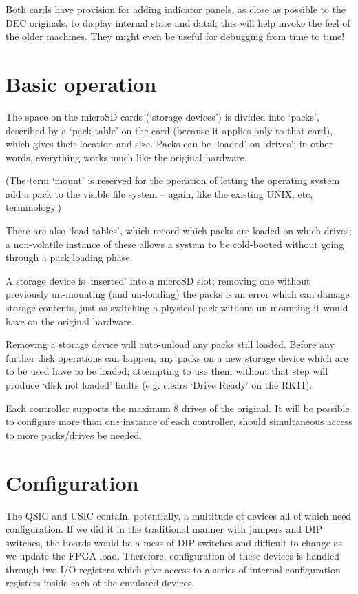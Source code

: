 Both cards have provision for adding indicator panels, as close as possible
to the DEC originals, to display internal state and datal; this will help
invoke the feel of the older machines. They might even be useful for
debugging from time to time!

\section{Basic operation}

The space on the microSD cards (`storage devices') is divided into `packs',
described by a `pack table' on the card (because it applies only to that
card), which gives their location and size. Packs can be `loaded' on
`drives'; in other words, everything works much like the original hardware.

(The term `mount' is reserved for the operation of letting the operating
system add a pack to the visible file system -- again, like the existing UNIX,
etc, terminology.)

There are also `load tables', which record which packs are loaded on which
drives; a non-volatile instance of these allows a system to be cold-booted
without going through a pack loading phase.

A storage device is `inserted' into a microSD slot; removing one without
previously un-mounting (and un-loading) the packs is an error which can
damage storage contents, just as switching a physical pack without
un-mounting it would have on the original hardware.

Removing a storage device will auto-unload any packs still loaded. Before any
further disk operations can happen, any packs on a new storage device which
are to be used have to be loaded; attempting to use them without that step
will produce `disk not loaded' faults (e.g. clears `Drive Ready' on the RK11).

Each controller supports the maximum 8 drives of the original. It will be
possible to configure more than one instance of each controller, should
simultaneous access to more packs/drives be needed.

\section{Configuration}
\label{conf}

The QSIC and USIC contain, potentially, a multitude of devices all of
which need configuration.  If we did it in the traditional manner with
jumpers and DIP switches, the boards would be a mess of DIP switches
and difficult to change as we update the FPGA load.  Therefore,
configuration of these devices is handled through two I/O registers
which give access to a series of internal configuration registers
inside each of the emulated devices.

